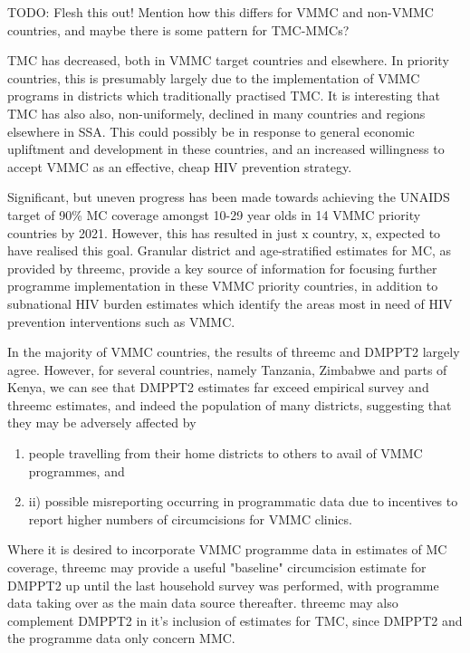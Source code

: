 \documentclass[a4paper, 12pt]{article}
\begin{document}
TODO: Flesh this out! Mention how this differs for VMMC and non-VMMC countries, and maybe there is some pattern for TMC-MMCs?

TMC has decreased, both in VMMC target countries and elsewhere. 
In priority countries, this is presumably largely due to the implementation of VMMC programs in districts which traditionally practised TMC. 
It is interesting that TMC has also also, non-uniformely, declined in many countries and regions elsewhere in SSA. 
This could possibly be in response to general economic upliftment and development in these countries, and an increased willingness to accept VMMC as an effective, cheap HIV prevention strategy. 

Significant, but uneven progress has been made towards achieving the UNAIDS target of 90\% 
MC coverage amongst 10-29 year olds in 14 VMMC priority countries by 2021.  
However, this has resulted in just x country, x, expected to have realised this goal.
Granular district and age-stratified estimates for MC, as provided by threemc, provide a key source of information for focusing further programme implementation in these VMMC priority countries, in addition to subnational HIV burden estimates which identify the areas most in need of HIV prevention interventions such as VMMC. 

In the majority of VMMC countries, the results of threemc and DMPPT2 largely agree. 
However, for several countries, namely Tanzania, Zimbabwe and parts of Kenya, we can see that DMPPT2 estimates far exceed empirical survey and threemc estimates, and indeed the population of many districts, suggesting that they may be adversely affected by 
\begin{enumerate}
\item people travelling from their home districts to others to avail of VMMC programmes, and
\item ii) possible misreporting occurring in programmatic data due to incentives to report higher numbers of circumcisions for VMMC clinics.
\end{enumerate}
Where it is desired to incorporate VMMC programme data in estimates of MC coverage, threemc may provide a useful "baseline" circumcision estimate for DMPPT2 up until the last household survey was performed, with programme data taking over as the main data source thereafter.  
threemc may also complement DMPPT2 in it's inclusion of estimates for TMC, since DMPPT2 and the programme data only concern MMC. 
\end{document}
